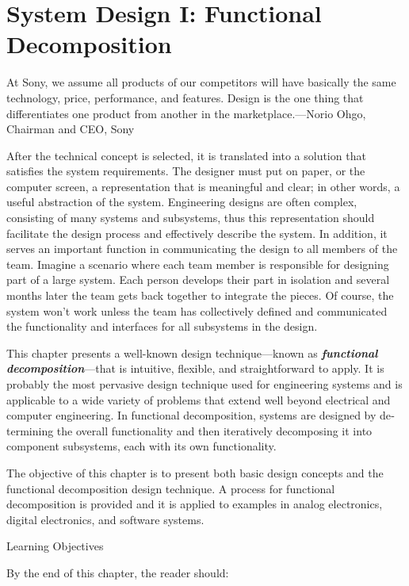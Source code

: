 \section{System Design I: Functional
Decomposition}\label{system-design-i-functional-decomposition}

At Sony, we assume all products of our competitors will have basically
the same technology, price, performance, and features. Design is the one
thing that differentiates one product from another in the
marketplace.---Norio Ohgo, Chairman and CEO, Sony

After the technical concept is selected, it is translated into a
solution that satisfies the system require­ments. The designer must put
on paper, or the computer screen, a representation that is meaning­ful
and clear; in other words, a useful abstraction of the system.
Engineering designs are often com­plex, consisting of many systems and
subsystems, thus this representation should facilitate the design
process and effectively describe the system. In addition, it serves an
im­portant function in communicat­ing the design to all members of the
team. Imag­ine a scenario where each team member is responsible for
designing part of a large system. Each person de­velops their part in
isolation and several months later the team gets back together to
integrate the pieces. Of course, the system won't work unless the team
has collectively defined and communicated the functionality and
interfaces for all subsystems in the design.

This chapter presents a well-known design technique---known as
\emph{\textbf{functional decomposi­tion}}---that is intuitive, flexible,
and straightforward to apply. It is probably the most pervasive design
technique used for engineering systems and is applicable to a wide
variety of prob­lems that extend well be­yond electrical and computer
engineering. In functional decomposition, systems are designed by
de­termining the overall functionality and then iteratively decomposing
it into component subsys­tems, each with its own functionality.

The objective of this chapter is to present both basic design concepts
and the functional decomposition design technique. A process for
functional decomposition is provided and it is applied to examples in
analog electronics, digital electronics, and software systems.

Learning Objectives

By the end of this chapter, the reader should:

